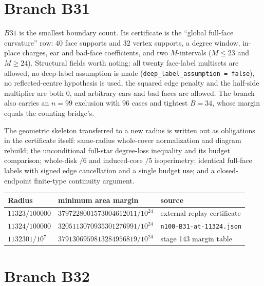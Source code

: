 \section{Branch B31}

$B31$ is the smallest boundary count. Its certificate is the ``global full-face curvature'' row:
$40$ face supports and $32$ vertex supports, a degree window, in-place charges, ear and bad-face
coefficients, and two $M$-intervals ($M\le23$ and $M\ge24$). Structural fields worth noting: all
twenty face-label multisets are allowed, no deep-label assumption is made
(\texttt{deep\_\allowbreak{}label\_\allowbreak{}assumption = false}), no reflected-centre hypothesis is used, the squared edge
penalty and the half-side multiplier are both $0$, and arbitrary ears and bad faces are allowed. The
branch also carries an $n=99$ exclusion with $96$ cases and tightest $B=34$, whose margin equals the
counting bridge's.

The geometric skeleton transferred to a new radius is written out as obligations in the certificate
itself: same-radius whole-cover normalization and diagram rebuild; the unconditional full-star
degree-loss inequality and its budget comparison; whole-disk $/6$ and induced-core $/5$
isoperimetry; identical full-face labels with signed edge cancellation and a single budget use; and
a closed-endpoint finite-type continuity argument.

\begin{center}
\footnotesize
\begin{tabular}{@{}>{\raggedright\arraybackslash}p{}>{\raggedright\arraybackslash}p{}>{\raggedright\arraybackslash}p{}@{}}
\toprule
Radius & minimum area margin & source \\
\midrule
$11323/100000$ & $3797228001573004612011/10^{24}$ & external replay certificate \\
$11324/100000$ & $3205113070935301276991/10^{24}$ & \texttt{n100-\allowbreak{}B31-\allowbreak{}at-\allowbreak{}11324.json} \\
$1132301/10^{7}$ & $3791306959813284956819/10^{24}$ & stage 143 margin table \\
\bottomrule
\end{tabular}
\end{center}

\section{Branch B32}

